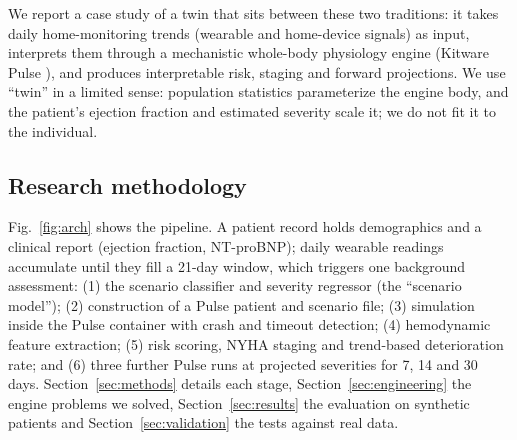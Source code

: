 \documentclass[conference]{IEEEtran}
\begin{document}
We report a case study of a twin that sits between these two traditions: it takes daily home-monitoring trends (wearable and home-device signals) as input, interprets them through a mechanistic whole-body physiology engine (Kitware Pulse \cite{bray2019pulse}), and produces interpretable risk, staging and forward projections. We use ``twin'' in a limited sense: population statistics parameterize the engine body, and the patient's ejection fraction and estimated severity scale it; we do not fit it to the individual.

\subsection{Research methodology}\label{sec:overview}
Fig.~\ref{fig:arch} shows the pipeline. A patient record holds demographics and a clinical report (ejection fraction, NT-proBNP); daily wearable readings accumulate until they fill a 21-day window, which triggers one background assessment: (1) the scenario classifier and severity regressor (the ``scenario model''); (2) construction of a Pulse patient and scenario file; (3) simulation inside the Pulse container with crash and timeout detection; (4) hemodynamic feature extraction; (5) risk scoring, NYHA staging and trend-based deterioration rate; and (6) three further Pulse runs at projected severities for 7, 14 and 30 days. Section~\ref{sec:methods} details each stage, Section~\ref{sec:engineering} the engine problems we solved, Section~\ref{sec:results} the evaluation on synthetic patients and Section~\ref{sec:validation} the tests against real data.
\end{document}
